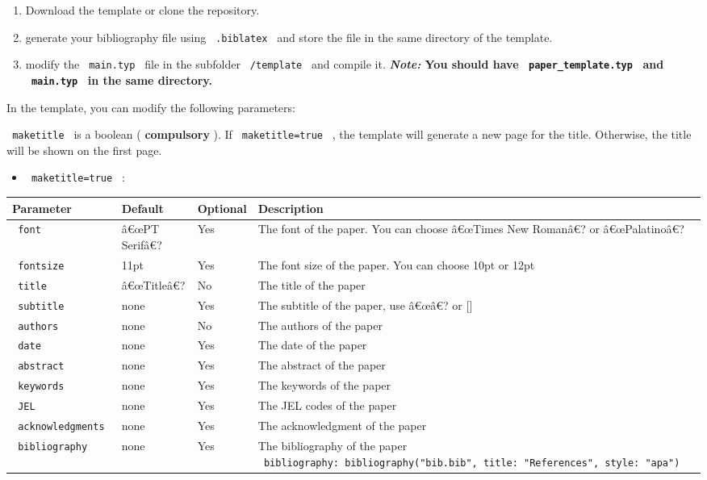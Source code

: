\begin{enumerate}
\tightlist
\item
  Download the template or clone the repository.
\item
  generate your bibliography file using \texttt{\ .biblatex\ } and store
  the file in the same directory of the template.
\item
  modify the \texttt{\ main.typ\ } file in the subfolder
  \texttt{\ /template\ } and compile it. \textbf{\emph{Note:} You should
  have \texttt{\ paper\_template.typ\ } and \texttt{\ main.typ\ } in the
  same directory.}
\end{enumerate}

In the template, you can modify the following parameters:

\texttt{\ maketitle\ } is a boolean ( \textbf{compulsory} ). If
\texttt{\ maketitle=true\ } , the template will generate a new page for
the title. Otherwise, the title will be shown on the first page.

\begin{itemize}
\tightlist
\item
  \texttt{\ maketitle=true\ } :
\end{itemize}

\begin{longtable}[]{@{}llll@{}}
\toprule\noalign{}
Parameter & Default & Optional & Description \\
\midrule\noalign{}
\endhead
\bottomrule\noalign{}
\endlastfoot
\texttt{\ font\ } & â€œPT Serifâ€? & Yes & The font of the paper. You
can choose â€œTimes New Romanâ€? or â€œPalatinoâ€? \\
\texttt{\ fontsize\ } & 11pt & Yes & The font size of the paper. You can
choose 10pt or 12pt \\
\texttt{\ title\ } & â€œTitleâ€? & No & The title of the paper \\
\texttt{\ subtitle\ } & none & Yes & The subtitle of the paper, use
â€œâ€? or {[}{]} \\
\texttt{\ authors\ } & none & No & The authors of the paper \\
\texttt{\ date\ } & none & Yes & The date of the paper \\
\texttt{\ abstract\ } & none & Yes & The abstract of the paper \\
\texttt{\ keywords\ } & none & Yes & The keywords of the paper \\
\texttt{\ JEL\ } & none & Yes & The JEL codes of the paper \\
\texttt{\ acknowledgments\ } & none & Yes & The acknowledgment of the
paper \\
\texttt{\ bibliography\ } & none & Yes & The bibliography of the paper
\texttt{\ bibliography:\ bibliography("bib.bib",\ title:\ "References",\ style:\ "apa")\ } \\
\end{longtable}

